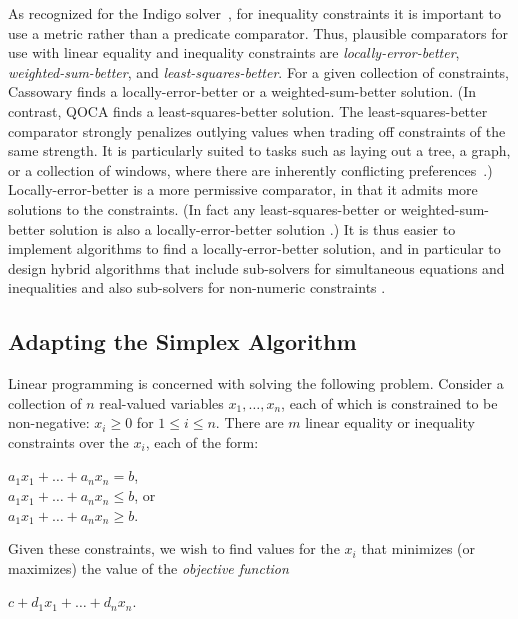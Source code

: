 \documentclass{article}
\begin{document}
As recognized for the Indigo solver~\cite{borning-uist-96},
for inequality constraints it is important to use a metric rather than a
predicate comparator.  Thus, plausible comparators for use with linear
equality and inequality constraints are \emph{locally-error-better}, 
\emph{weighted-sum-better}, and \emph{least-squares-better}.  
For a given
collection of constraints, Cassowary finds a locally-error-better or a
weighted-sum-better solution.
(In contrast, QOCA finds a least-squares-better solution.
The least-squares-better comparator strongly
penalizes outlying values when trading off constraints of the same
strength.  It is particularly suited to tasks such as laying out a tree, a
graph, or a collection of windows, where there are inherently conflicting
preferences~\cite{borning-simplex-tr}.)
Locally-error-better is a more permissive
comparator, in that it admits more solutions to the constraints.  (In fact
any least-squares-better or weighted-sum-better solution is also a
locally-error-better solution \cite{borning-lisp-symbolic-computation-92}.)
It is thus easier to implement algorithms to find a locally-error-better
solution, and in particular to design hybrid algorithms that include
sub-solvers for simultaneous equations and inequalities and also sub-solvers
for non-numeric constraints \cite{borning-cp-95}.

\subsection{Adapting the Simplex Algorithm}

Linear programming is concerned with solving the following problem.  Consider
a collection of $n$ real-valued variables $x_1, \ldots, x_n$, each
of which  is constrained to be non-negative: 
$x_i \geq 0$ for $1 \leq i \leq n$.  There are  $m$
linear equality or inequality constraints over the $x_i$, each of the form:

\hspace*{5mm}\mbox{$a_1 x_1 + \ldots + a_n x_n = b$},\\
\hspace*{5mm}\mbox{$a_1 x_1 + \ldots + a_n x_n \leq b$},  or\\
\hspace*{5mm}\mbox{$a_1 x_1 + \ldots + a_n x_n \geq b$}.

Given these constraints, we wish to find values for the $x_i$ that minimizes 
(or maximizes) the value of the \emph{objective function}

\hspace*{5mm}$c + d_1 x_1 + \ldots + d_n x_n$.
\end{document}
